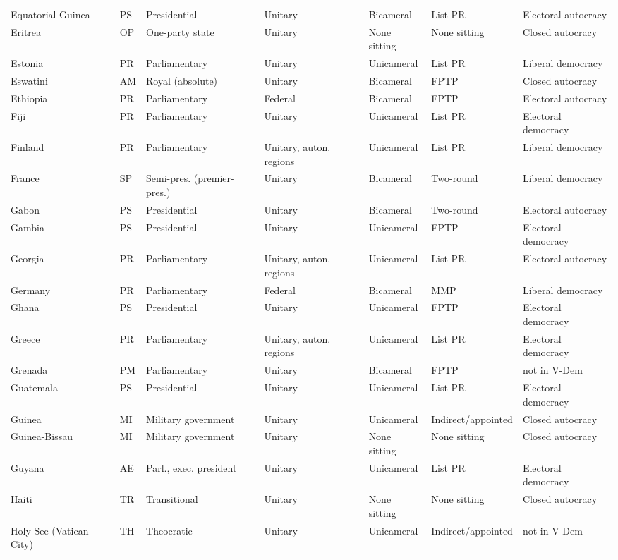 \documentclass[11pt,a4paper]{article}
\begin{document}
{\begin{longtable}{p{2.9cm}lp{2.9cm}p{2.4cm}lp{1.9cm}p{2.0cm}}
Equatorial Guinea & PS & Presidential & Unitary & Bicameral & List PR & Electoral autocracy\\
Eritrea & OP & One-party state & Unitary & None sitting & None sitting & Closed autocracy\\
Estonia & PR & Parliamentary & Unitary & Unicameral & List PR & Liberal democracy\\
Eswatini & AM & Royal (absolute) & Unitary & Bicameral & FPTP & Closed autocracy\\
Ethiopia & PR & Parliamentary & Federal & Bicameral & FPTP & Electoral autocracy\\
Fiji & PR & Parliamentary & Unitary & Unicameral & List PR & Electoral democracy\\
Finland & PR & Parliamentary & Unitary, auton. regions & Unicameral & List PR & Liberal democracy\\
France & SP & Semi-pres. (premier-pres.) & Unitary & Bicameral & Two-round & Liberal democracy\\
Gabon & PS & Presidential & Unitary & Bicameral & Two-round & Electoral autocracy\\
Gambia & PS & Presidential & Unitary & Unicameral & FPTP & Electoral democracy\\
Georgia & PR & Parliamentary & Unitary, auton. regions & Unicameral & List PR & Electoral autocracy\\
Germany & PR & Parliamentary & Federal & Bicameral & MMP & Liberal democracy\\
Ghana & PS & Presidential & Unitary & Unicameral & FPTP & Electoral democracy\\
Greece & PR & Parliamentary & Unitary, auton. regions & Unicameral & List PR & Electoral democracy\\
Grenada & PM & Parliamentary & Unitary & Bicameral & FPTP & not in V-Dem\\
Guatemala & PS & Presidential & Unitary & Unicameral & List PR & Electoral democracy\\
Guinea & MI & Military government & Unitary & Unicameral & Indirect/appointed & Closed autocracy\\
Guinea-Bissau & MI & Military government & Unitary & None sitting & None sitting & Closed autocracy\\
Guyana & AE & Parl., exec. president & Unitary & Unicameral & List PR & Electoral democracy\\
Haiti & TR & Transitional & Unitary & None sitting & None sitting & Closed autocracy\\
Holy See (Vatican City) & TH & Theocratic & Unitary & Unicameral & Indirect/appointed & not in V-Dem\\

\end{longtable}}
\end{document}
